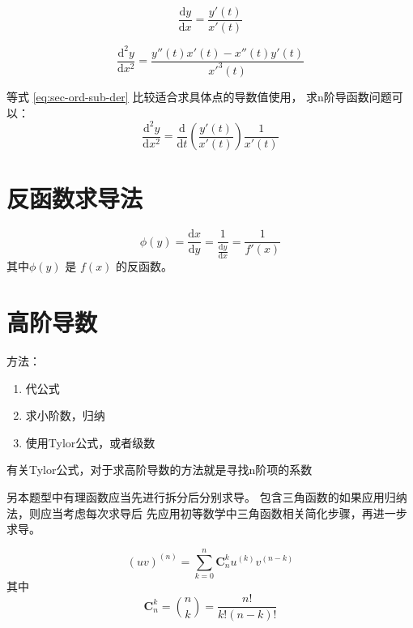\begin{lemma}
    \begin{equation}
        \dfrac{\mathrm{d}y}{\mathrm{d}x} = \dfrac{y'(t)}{x'(t)}
    \end{equation}

    \begin{equation}\label{eq:sec-ord-sub-der}
        \dfrac{\mathrm{d}^2 y}{\mathrm{d}x^2} = \dfrac{y''(t) x'(t) -x''(t) y'(t)}{x'^3(t)}
    \end{equation}

    等式 \ref{eq:sec-ord-sub-der} 比较适合求具体点的导数值使用，
    求n阶导函数问题可以：
    \begin{equation}
        \dfrac{\mathrm{d}^2y}{\mathrm{d}x^2} = 
        \dfrac{\mathrm{d}}{\mathrm{d}t} 
        \left(
            \dfrac{y'(t)}{x'(t)} 
        \right)
        \dfrac{1}{x'(t)}
    \end{equation}
\end{lemma}

\section{反函数求导法}

\begin{lemma}
    \begin{equation}
        \phi (y) = \dfrac{\mathrm{d}x}{\mathrm{d}y} = \dfrac{1}{\frac{\mathrm{d}y}{\mathrm{d}x}}
                   = \dfrac{1}{f'(x)}
    \end{equation}
    其中$\phi(y)$ 是 $f(x)$ 的反函数。
\end{lemma}

\section{高阶导数}

方法：
\begin{enumerate}
    \item 代公式
    \item 求小阶数，归纳
    \item 使用Tylor公式，或者级数
\end{enumerate}
有关Tylor公式，对于求高阶导数的方法就是寻找n阶项的系数

另本题型中有理函数应当先进行拆分后分别求导。
包含三角函数的如果应用归纳法，则应当考虑每次求导后
先应用初等数学中三角函数相关简化步骤，再进一步求导。

\begin{lemma}
    \begin{equation}\label{eq:uv-n-order-derivitive}
        (uv)^{(n)} = \sum_{k=0}^{n} \mathbf{C}^{k}_{n} u^{(k)} v^{(n-k)}
    \end{equation}
    其中
    \begin{equation*}
        \mathbf{C}^{k}_{n} = \binom{n}{k} = \dfrac{n!}{k!(n-k)!}
    \end{equation*}
\end{lemma}

